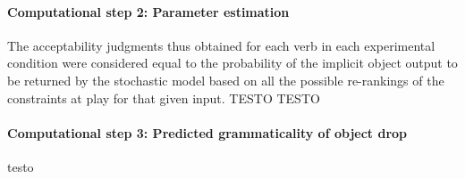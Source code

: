 \paragraph{Computational step 2: Parameter estimation} The acceptability judgments thus obtained for each verb in each experimental condition were considered equal to the probability of the implicit object output to be returned by the stochastic model based on all the possible re-rankings of the constraints at play for that given input. TESTO TESTO

\paragraph{Computational step 3: Predicted grammaticality of object drop} testo




